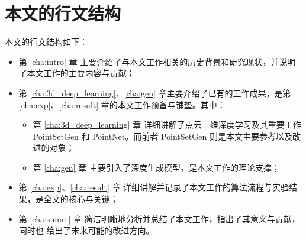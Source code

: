 \section{本文的行文结构}
本文的行文结构如下：
\begin{itemize}
	\item %
	      第 \ref{cha:intro} 章%
	      主要介绍了与本文工作相关的历史背景和研究现状，并说明了本文工作的主要内容与贡献；

	\item 第 \ref{cha:3d_deep_learning}、\ref{cha:gen} 章主要介绍了已有的工作成果，是第 \ref{cha:exp}、\ref{cha:result} 章的本文工作预备与铺垫。其中：
	      \begin{itemize}
		      \item %
		            第 \ref{cha:3d_deep_learning} 章
		            详细讲解了点云三维深度学习及其重要工作 PointSetGen\cite{pointsetgen} 和 PointNet\cite{pointnet}。而前者 PointSetGen 则是本文主要参考以及改进的对象；
		      \item %
		            第 \ref{cha:gen} 章%
		            主要引入了深度生成模型，是本文工作的理论支撑；
	      \end{itemize}
	\item %
	      第 \ref{cha:exp}、\ref{cha:result} 章%
	      详细讲解并记录了本文工作的算法流程与实验结果，是全文的核心与关键；
	\item %
	      第 \ref{cha:summ} 章%
	      简洁明晰地分析并总结了本文工作，指出了其意义与贡献，
	      同时也
	      给出了未来可能的改进方向。

\end{itemize}








% 
% 
% 
% 

